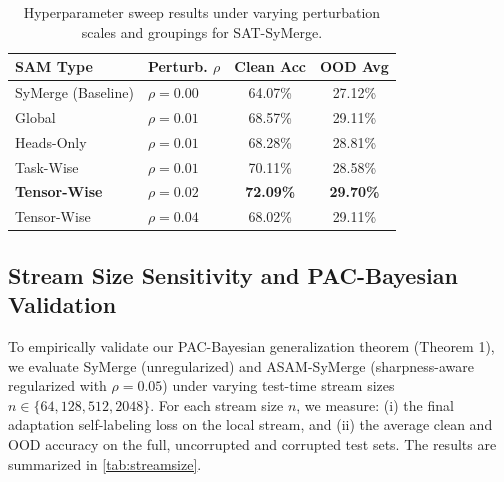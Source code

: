 \documentclass{article}
\begin{document}
\begin{table}[h]
\centering
\caption{Hyperparameter sweep results under varying perturbation scales and groupings for SAT-SyMerge.}
\label{tab:sweep}
\vspace{0.1in}
\footnotesize
\setlength{\tabcolsep}{2.0pt}
\begin{tabular}{llcc}
\toprule
\textbf{SAM Type} & \textbf{Perturb. $\rho$} & \textbf{Clean Acc} & \textbf{OOD Avg} \\
\midrule
SyMerge (Baseline) & $\rho = 0.00$ & 64.07\% & 27.12\% \\
\midrule
Global & $\rho = 0.01$ & 68.57\% & 29.11\% \\
Heads-Only & $\rho = 0.01$ & 68.28\% & 28.81\% \\
Task-Wise & $\rho = 0.01$ & 70.11\% & 28.58\% \\
\textbf{Tensor-Wise} & \textbf{$\rho = 0.02$} & \textbf{72.09\%} & \textbf{29.70\%} \\
Tensor-Wise & $\rho = 0.04$ & 68.02\% & 29.11\% \\
\bottomrule
\end{tabular}
\end{table}

\subsection{Stream Size Sensitivity and PAC-Bayesian Validation}
To empirically validate our PAC-Bayesian generalization theorem (Theorem 1), we evaluate SyMerge (unregularized) and ASAM-SyMerge (sharpness-aware regularized with $\rho = 0.05$) under varying test-time stream sizes $n \in \{64, 128, 512, 2048\}$. For each stream size $n$, we measure: (i) the final adaptation self-labeling loss on the local stream, and (ii) the average clean and OOD accuracy on the full, uncorrupted and corrupted test sets. The results are summarized in \cref{tab:streamsize}.
\end{document}
